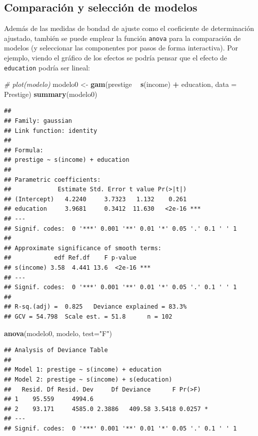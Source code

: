 \documentclass[
]{book}
\newenvironment{Shaded}{\begin{snugshade}}{\end{snugshade}}
\newcommand{\CommentTok}[1]{\textcolor[rgb]{0.56,0.35,0.01}{\textit{#1}}}
\newcommand{\DataTypeTok}[1]{\textcolor[rgb]{0.13,0.29,0.53}{#1}}
\newcommand{\KeywordTok}[1]{\textcolor[rgb]{0.13,0.29,0.53}{\textbf{#1}}}
\newcommand{\NormalTok}[1]{#1}
\newcommand{\OperatorTok}[1]{\textcolor[rgb]{0.81,0.36,0.00}{\textbf{#1}}}
\newcommand{\StringTok}[1]{\textcolor[rgb]{0.31,0.60,0.02}{#1}}
\theoremstyle{break}
\theoremstyle{definition}
\theoremstyle{definition}
\theoremstyle{definition}
\theoremstyle{remark}
\begin{document}
\hypertarget{comparaciuxf3n-y-selecciuxf3n-de-modelos}{%
\subsection{Comparación y selección de modelos}\label{comparaciuxf3n-y-selecciuxf3n-de-modelos}}

Además de las medidas de bondad de ajuste como el coeficiente de determinación ajustado, también se puede emplear la función \texttt{anova} para la comparación de modelos (y seleccionar las componentes por pasos de forma interactiva).
Por ejemplo, viendo el gráfico de los efectos se podría pensar que el efecto de \texttt{education} podría ser lineal:

\begin{Shaded}
\begin{Highlighting}[]
\CommentTok{# plot(modelo)}
\NormalTok{modelo0 <-}\StringTok{ }\KeywordTok{gam}\NormalTok{(prestige }\OperatorTok{~}\StringTok{ }\KeywordTok{s}\NormalTok{(income) }\OperatorTok{+}\StringTok{ }\NormalTok{education, }\DataTypeTok{data =}\NormalTok{ Prestige)}
\KeywordTok{summary}\NormalTok{(modelo0)}
\end{Highlighting}
\end{Shaded}

\begin{verbatim}
## 
## Family: gaussian 
## Link function: identity 
## 
## Formula:
## prestige ~ s(income) + education
## 
## Parametric coefficients:
##             Estimate Std. Error t value Pr(>|t|)    
## (Intercept)   4.2240     3.7323   1.132    0.261    
## education     3.9681     0.3412  11.630   <2e-16 ***
## ---
## Signif. codes:  0 '***' 0.001 '**' 0.01 '*' 0.05 '.' 0.1 ' ' 1
## 
## Approximate significance of smooth terms:
##            edf Ref.df    F p-value    
## s(income) 3.58  4.441 13.6  <2e-16 ***
## ---
## Signif. codes:  0 '***' 0.001 '**' 0.01 '*' 0.05 '.' 0.1 ' ' 1
## 
## R-sq.(adj) =  0.825   Deviance explained = 83.3%
## GCV = 54.798  Scale est. = 51.8      n = 102
\end{verbatim}

\begin{Shaded}
\begin{Highlighting}[]
\KeywordTok{anova}\NormalTok{(modelo0, modelo, }\DataTypeTok{test=}\StringTok{"F"}\NormalTok{)}
\end{Highlighting}
\end{Shaded}

\begin{verbatim}
## Analysis of Deviance Table
## 
## Model 1: prestige ~ s(income) + education
## Model 2: prestige ~ s(income) + s(education)
##   Resid. Df Resid. Dev     Df Deviance      F Pr(>F)  
## 1    95.559     4994.6                                
## 2    93.171     4585.0 2.3886   409.58 3.5418 0.0257 *
## ---
## Signif. codes:  0 '***' 0.001 '**' 0.01 '*' 0.05 '.' 0.1 ' ' 1
\end{verbatim}
\end{document}
